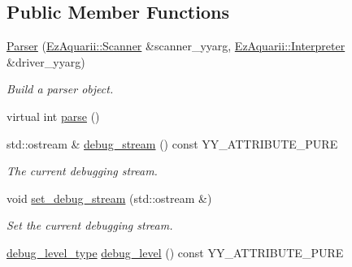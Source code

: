 \subsection*{Public Member Functions}
\begin{DoxyCompactItemize}
\item 
\hyperlink{classEzAquarii_1_1Parser_acd08ae3a93fb14cc80ba83233b57f301}{Parser} (\hyperlink{classEzAquarii_1_1Scanner}{Ez\+Aquarii\+::\+Scanner} \&scanner\+\_\+yyarg, \hyperlink{classEzAquarii_1_1Interpreter}{Ez\+Aquarii\+::\+Interpreter} \&driver\+\_\+yyarg)\hypertarget{classEzAquarii_1_1Parser_acd08ae3a93fb14cc80ba83233b57f301}{}\label{classEzAquarii_1_1Parser_acd08ae3a93fb14cc80ba83233b57f301}

\begin{DoxyCompactList}\small\item\em Build a parser object. \end{DoxyCompactList}\item 
virtual int \hyperlink{classEzAquarii_1_1Parser_a5b6486cacbe811c9099d235ecdee0f0d}{parse} ()
\item 
std\+::ostream \& \hyperlink{classEzAquarii_1_1Parser_a8676fbc29497d80dc94dcc6fa8f3ee52}{debug\+\_\+stream} () const Y\+Y\+\_\+\+A\+T\+T\+R\+I\+B\+U\+T\+E\+\_\+\+P\+U\+RE\hypertarget{classEzAquarii_1_1Parser_a8676fbc29497d80dc94dcc6fa8f3ee52}{}\label{classEzAquarii_1_1Parser_a8676fbc29497d80dc94dcc6fa8f3ee52}

\begin{DoxyCompactList}\small\item\em The current debugging stream. \end{DoxyCompactList}\item 
void \hyperlink{classEzAquarii_1_1Parser_a52d6d4b537c8d25077bc5dc8975fb45a}{set\+\_\+debug\+\_\+stream} (std\+::ostream \&)\hypertarget{classEzAquarii_1_1Parser_a52d6d4b537c8d25077bc5dc8975fb45a}{}\label{classEzAquarii_1_1Parser_a52d6d4b537c8d25077bc5dc8975fb45a}

\begin{DoxyCompactList}\small\item\em Set the current debugging stream. \end{DoxyCompactList}\item 
\hyperlink{classEzAquarii_1_1Parser_a945601d6f0ff5d112687ff087ba4eee5}{debug\+\_\+level\+\_\+type} \hyperlink{classEzAquarii_1_1Parser_a4810ec57cbf0ef29f0045cb49580867e}{debug\+\_\+level} () const Y\+Y\+\_\+\+A\+T\+T\+R\+I\+B\+U\+T\+E\+\_\+\+P\+U\+RE\hypertarget{classEzAquarii_1_1Parser_a4810ec57cbf0ef29f0045cb49580867e}{}\label{classEzAquarii_1_1Parser_a4810ec57cbf0ef29f0045cb49580867e}


\end{DoxyCompactItemize}
